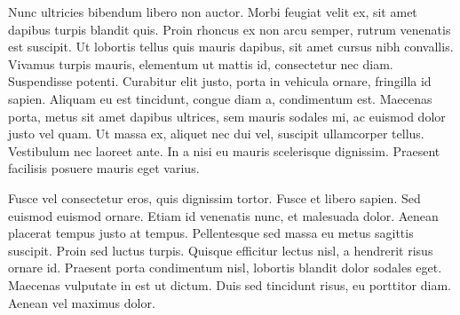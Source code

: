 \documentclass{article}
\begin{document}
Nunc ultricies bibendum libero non auctor. Morbi feugiat velit ex, sit amet dapibus turpis blandit quis. Proin rhoncus ex non arcu semper, rutrum venenatis est suscipit. Ut lobortis tellus quis mauris dapibus, sit amet cursus nibh convallis. Vivamus turpis mauris, elementum ut mattis id, consectetur nec diam. Suspendisse potenti. Curabitur elit justo, porta in vehicula ornare, fringilla id sapien. Aliquam eu est tincidunt, congue diam a, condimentum est. Maecenas porta, metus sit amet dapibus ultrices, sem mauris sodales mi, ac euismod dolor justo vel quam. Ut massa ex, aliquet nec dui vel, suscipit ullamcorper tellus. Vestibulum nec laoreet ante. In a nisi eu mauris scelerisque dignissim. Praesent facilisis posuere mauris eget varius.

Fusce vel consectetur eros, quis dignissim tortor. Fusce et libero sapien. Sed euismod euismod ornare. Etiam id venenatis nunc, et malesuada dolor. Aenean placerat tempus justo at tempus. Pellentesque sed massa eu metus sagittis suscipit. Proin sed luctus turpis. Quisque efficitur lectus nisl, a hendrerit risus ornare id. Praesent porta condimentum nisl, lobortis blandit dolor sodales eget. Maecenas vulputate in est ut dictum. Duis sed tincidunt risus, eu porttitor diam. Aenean vel maximus dolor.
\end{document}
